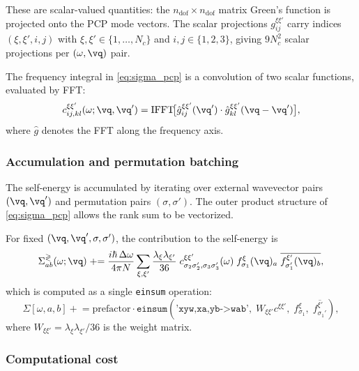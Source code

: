 These are scalar-valued quantities: the $n_\mathrm{dof} \times
n_\mathrm{dof}$ matrix Green's function is projected onto the PCP mode
vectors.  The scalar
projections $g_{ij}^{\xi\xi'}$ carry indices
$(\xi, \xi', i, j)$ with $\xi, \xi' \in \{1, \ldots, N_c\}$ and
$i, j \in \{1, 2, 3\}$, giving $9 N_c^2$ scalar projections per
$(\omega, \vq)$ pair.

The frequency integral in \cref{eq:sigma_pcp} is a convolution of two
scalar functions, evaluated by FFT:
\begin{equation}
  c_{ij,kl}^{\xi\xi'}(\omega; \vq, \vq')
  = \mathrm{IFFT}\!\bigl[
    \hat{g}_{ij}^{\xi\xi'}(\vq') \cdot
    \hat{g}_{kl}^{\xi\xi'}(\vq - \vq')
  \bigr],
\end{equation}
where $\hat{g}$ denotes the FFT along the frequency axis.

\subsubsection{Accumulation and permutation batching}
\label{sssub:pcp_accumulation}

The self-energy is accumulated by iterating over external wavevector
pairs $(\vq, \vq')$ and permutation pairs $(\sigma, \sigma')$.  The
outer product structure of \cref{eq:sigma_pcp} allows the rank sum to
be vectorized.

For fixed $(\vq, \vq', \sigma, \sigma')$, the contribution to the
self-energy is
\begin{equation}\label{eq:pcp_accum}
  \Sigma^{\gtrless}_{ab}(\omega; \vq)
  \mathrel{+}=
  \frac{i\hbar \,\Delta\omega}{4\pi N}
  \sum_{\xi,\xi'}
  \frac{\lambda_\xi \lambda_{\xi'}}{36}\;
  c_{\sigma_2\sigma_2', \sigma_3\sigma_3'}^{\xi\xi'}(\omega)\;
  f_{\sigma_1}^{\xi}(\vq)_a\;
  \overline{f_{\sigma_1'}^{\xi'}(\vq)_b},
\end{equation}
which is computed as a single \texttt{einsum} operation:
\begin{equation*}
  \Sigma[\omega, a, b]
  \mathrel{+}=
  \mathrm{prefactor} \cdot
  \texttt{einsum}(\texttt{'xyw,xa,yb->wab'},\;
  W_{\xi\xi'} c^{\xi\xi'},\;
  f_{\sigma_1}^\xi,\;
  \overline{f_{\sigma_1'}^{\xi'}}),
\end{equation*}
where $W_{\xi\xi'} = \lambda_\xi \lambda_{\xi'} / 36$ is the weight
matrix.


\subsubsection{Computational cost}
\label{sssub:pcp_cost}

